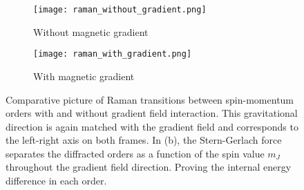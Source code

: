 \begin{figure}[!htbp]
	\centering
	\begin{subfigure}{.5\textwidth}
		\centering
		\texttt{[image: raman\_without\_gradient.png]}
		\caption{Without magnetic gradient}
		\label{fig:raman_without_gradient}
	\end{subfigure}%
	\begin{subfigure}{.5\textwidth}
		\centering
		\texttt{[image: raman\_with\_gradient.png]}
		\caption{With magnetic gradient}
		\label{fig:raman_with_gradient}
	\end{subfigure}
	\caption[Comparative picture of Raman transitions between spin-momentum orders with and without gradient field interaction]{Comparative picture of Raman transitions between spin-momentum orders with and without gradient field interaction. This gravitational direction is again matched with the gradient field and corresponds to the left-right axis on both frames. In (b), the Stern-Gerlach force separates the diffracted orders as a function of the spin value $m_J$ throughout the gradient field direction. Proving the internal energy difference in each order. }
	\label{fig:raman_gradient}
\end{figure}

